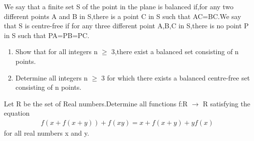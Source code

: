 \item We say that a finite set S of the point in the plane is balanced if,for any two different points A and B in S,there is a point C in S such that AC=BC.We say that S is centre-free if for any three different point A,B,C in S,there is no point P in S such that PA=PB=PC.
\begin{enumerate}
\item Show that for all integers n $\geq$ 3,there exist a balanced set consisting of n points.
\item Determine all integers n $\geq$ 3 for which there exists a balanced centre-free set consisting of n points.
\end{enumerate}

\item Let R be the set of Real numbers.Determine all functions f:R $\rightarrow$ R satisfying the equation
\begin{align*}
f(x+f(x+y))+f(xy)=x+f(x+y)+yf(x)
\end{align*}
for all real numbers x and y.
